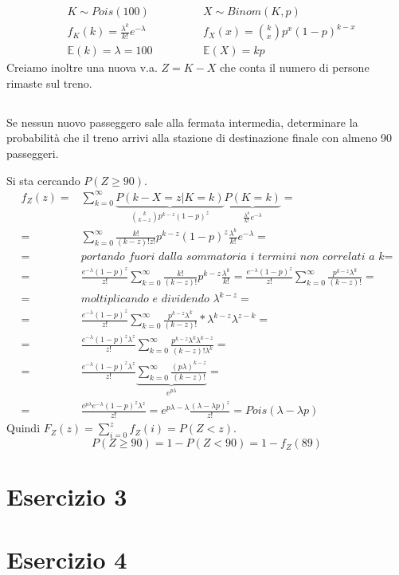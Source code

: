 \documentclass[a4paper]{article}
\newcommand{\E}[0]{\mathbb{E}}
\begin{document}
\begin{align*}
	&K \sim Pois(100) \qquad \qquad &X \sim Binom(K,p)\\
	&f_K(k) = \frac{\lambda^k}{k!}e^{-\lambda} &f_X(x) = \binom{k}{x}p^x(1-p)^{k-x}\\
	&\E(k) = \lambda=100 &\E(X) = kp
\end{align*}
Creiamo inoltre una nuova v.a. $Z = K-X$ che conta il numero di persone rimaste sul treno.
\subsection{}
Se nessun nuovo passeggero sale alla fermata intermedia, determinare la probabilità che il treno arrivi alla stazione di destinazione finale con almeno 90 passeggeri.

Si sta cercando $P(Z \geq 90)$.
\begin{align*}
	f_Z(z)=& \sum_{k=0}^{\infty} \underbrace{P(k - X = z | K=k)}_{\binom{k}{k-z}p^{k-z}(1-p)^{z}} \underbrace{P(K=k)}_{\frac{\lambda^k}{k!}e^{-\lambda}} =\\
	       =& \sum_{k=0}^{\infty} \frac{k!}{(k-z)! z!} p^{k-z}(1-p)^{z}\frac{\lambda^k}{k!}e^{-\lambda} = \\
	       =& \textit{portando fuori dalla sommatoria i termini non correlati a k} =\\
	       =& \frac{e^{-\lambda} (1-p)^z}{z!} \sum_{k=0}^{\infty} \frac{k!}{(k-z)!}p^{k-z}\frac{\lambda^k}{k!} = \frac{e^{-\lambda} (1-p)^z}{z!} \sum_{k=0}^{\infty} \frac{p^{k-z}\lambda^k}{(k-z)!} =\\
	       =& \textit{moltiplicando e dividendo $\lambda^{k-z}$} =\\
	       =& \frac{e^{-\lambda} (1-p)^z}{z!} \sum_{k=0}^{\infty} \frac{p^{k-z}\lambda^k}{(k-z)!} * \lambda^{k-z} \lambda^{z-k} =\\ 
	       =&\frac{e^{-\lambda} (1-p)^z \lambda^z}{z!} \sum_{k=0}^{\infty} \frac{p^{k-z}\lambda^k \lambda^{k-z}}{(k-z)! \lambda^k} = \\
	       =& \frac{e^{-\lambda} (1-p)^z \lambda^z}{z!} \underbrace{\sum_{k=0}^{\infty} \frac{(p\lambda)^{k-z}}{(k-z)!}}_{e^{p\lambda}}= \\ %
	       =& \frac{e^{p\lambda} e^{-\lambda} (1-p)^z \lambda^z}{z!} = e^{p\lambda - \lambda} \frac{(\lambda - \lambda p)^z}{z!} = Pois(\lambda - \lambda p)
\end{align*}
Quindi $F_Z(z) = \sum_{i=0}^{z} f_Z(i) = P(Z < z)$.\\
$$ P(Z \geq 90) = 1 - P(Z < 90) = 1 - f_Z(89)$$

\subsection{}

\section{Esercizio 3}
\section{Esercizio 4}
\end{document}
